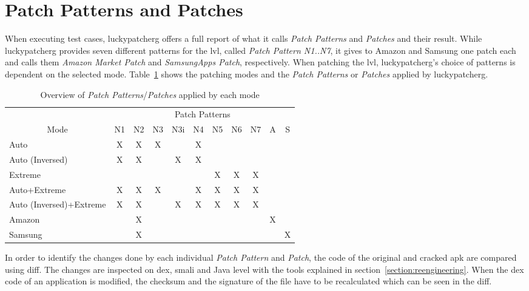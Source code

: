 \section{Patch Patterns and Patches} \label{section:luckypatcher-patterns}
When executing test cases, \gls{luckypatcherg} offers a full report of what it calls \textit{Patch Patterns} and \textit{Patches} and their result.
While \gls{luckypatcherg} provides seven different patterns for the \gls{lvl}, called \textit{Patch Pattern N1..N7}, it gives to Amazon and Samsung one patch each and calls them \textit{Amazon Market Patch} and \textit{SamsungApps Patch}, respectively.
\newline
When patching the \gls{lvl}, \gls{luckypatcherg}'s choice of patterns is dependent on the selected mode.
Table~\ref{table:patterns} shows the patching modes and the \textit{Patch Patterns} or \textit{Patches} applied by \gls{luckypatcherg}.
\newline
\begin{table}[h]
\centering
\begin{tabular}{l|cccccccccc}
              & \multicolumn{10}{c}{Patch Patterns}      \\
\multicolumn{1}{c|}{Mode} & N1 & N2 & N3 & N3i & N4 & N5 & N6 & N7 & A & S \\ \hline
Auto            & X & X & X &   & X &  &  & && \\
Auto (Inversed)      & X & X &   & X  & X &  &  & && \\
Extreme          &  &  &  &   &  & X & X & X && \\
Auto+Extreme        & X & X & X &   & X & X & X & X && \\
Auto (Inversed)+Extreme  & X & X &  & X  & X & X & X &X &&\\
Amazon        &  & X&  &   &  &  &  & & X &\\
Samsung        &  &  X&  &   &  &  &  &  & & X
\end{tabular}
\caption{Overview of \textit{Patch Patterns}/\textit{Patches} applied by each mode}
\label{table:patterns}
\end{table}
\newline
In order to identify the changes done by each individual \textit{Patch Pattern} and \textit{Patch}, the code of the original and cracked \gls{apk} are compared using diff.
The changes are inspected on dex, smali and Java level with the tools explained in section~\ref{section:reengineering}.
\newline
When the dex code of an application is modified, the checksum and the signature of the file have to be recalculated which can be seen in the diff.
